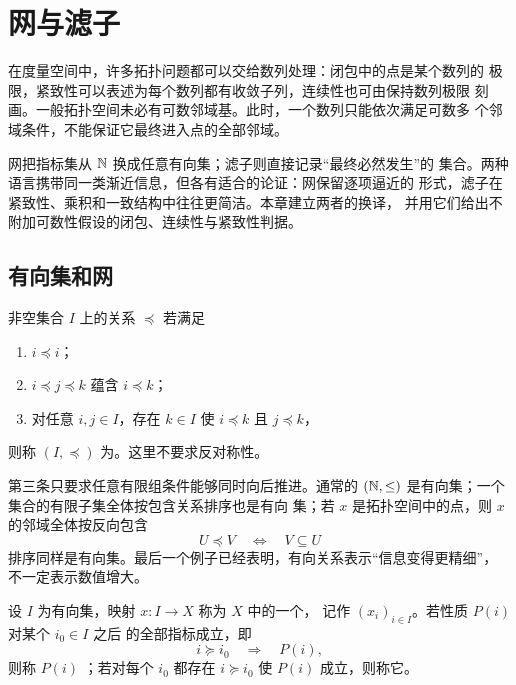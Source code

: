 \chapter{网与滤子}
\label{chap:nets-filters}

在度量空间中，许多拓扑问题都可以交给数列处理：闭包中的点是某个数列的
极限，紧致性可以表述为每个数列都有收敛子列，连续性也可由保持数列极限
刻画。一般拓扑空间未必有可数邻域基。此时，一个数列只能依次满足可数多
个邻域条件，不能保证它最终进入点的全部邻域。

网把指标集从 \(\mathbb{N}\) 换成任意有向集；滤子则直接记录“最终必然发生”的
集合。两种语言携带同一类渐近信息，但各有适合的论证：网保留逐项逼近的
形式，滤子在紧致性、乘积和一致结构中往往更简洁。本章建立两者的换译，
并用它们给出不附加可数性假设的闭包、连续性与紧致性判据。

\section{有向集和网}

\begin{definition}[有向集]
非空集合 \(I\) 上的关系 \(\preccurlyeq\) 若满足
\begin{enumerate}[label=\textup{(\roman*)}]
 \item \(i\preccurlyeq i\)；
 \item \(i\preccurlyeq j\preccurlyeq k\) 蕴含 \(i\preccurlyeq k\)；
 \item 对任意 \(i,j\in I\)，存在 \(k\in I\) 使
 \(i\preccurlyeq k\) 且 \(j\preccurlyeq k\)，
\end{enumerate}
则称 \((I,\preccurlyeq)\) 为。这里不要求反对称性。
\end{definition}

第三条只要求任意有限组条件能够同时向后推进。通常的
\((\mathbb{N},\le)\) 是有向集；一个集合的有限子集全体按包含关系排序也是有向
集；若 \(x\) 是拓扑空间中的点，则 \(x\) 的邻域全体按反向包含
\[
 U\preccurlyeq V\quad\Longleftrightarrow\quad V\subseteq U
\]
排序同样是有向集。最后一个例子已经表明，有向关系表示“信息变得更精细”，
不一定表示数值增大。

\begin{definition}[网]
设 \(I\) 为有向集，映射 \(x:I\to X\) 称为 \(X\) 中的一个，
记作 \((x_i)_{i\in I}\)。若性质 \(P(i)\) 对某个 \(i_0\in I\) 之后
的全部指标成立，即
\[
 i\succcurlyeq i_0\quad\Longrightarrow\quad P(i),
\]
则称 \(P(i)\) ；若对每个 \(i_0\) 都存在
\(i\succcurlyeq i_0\) 使 \(P(i)\) 成立，则称它。
\end{definition}

